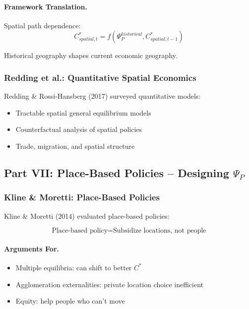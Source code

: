 \paragraph{Framework Translation.}
Spatial path dependence:
\begin{equation}
C^*_{spatial,t} = f(\Psi_P^{historical}, C^*_{spatial,t-1})
\end{equation}

Historical geography shapes current economic geography.

\subsubsection{Redding et al.: Quantitative Spatial Economics}

Redding \& Rossi-Hansberg (2017) surveyed quantitative models:
\begin{itemize}
    \item Tractable spatial general equilibrium models
    \item Counterfactual analysis of spatial policies
    \item Trade, migration, and spatial structure
\end{itemize}

\subsection{Part VII: Place-Based Policies – Designing $\Psi_P$}

\subsubsection{Kline \& Moretti: Place-Based Policies}

Kline \& Moretti (2014) evaluated place-based policies:

\begin{equation}
\boxed{
\text{Place-based policy} = \text{Subsidize locations, not people}
}
\label{eq:place-based}
\end{equation}

\paragraph{Arguments For.}
\begin{itemize}
    \item Multiple equilibria: can shift to better $C^*$
    \item Agglomeration externalities: private location choice inefficient
    \item Equity: help people who can't move
\end{itemize}

